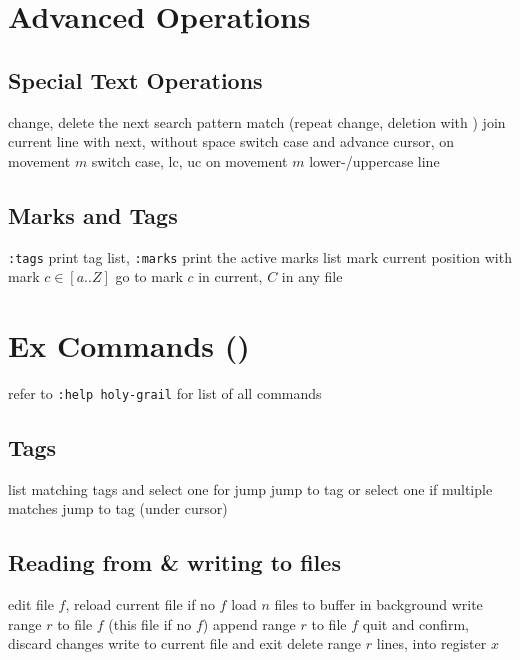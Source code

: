 \section{Advanced Operations}{}
\subsection{Special Text Operations}{}
	{change, delete the next search pattern match (repeat change, deletion with )}
	{join current line with next, without space}
	{switch case and advance cursor, on movement $m$ }
	{switch case, lc, uc on movement $m$}
	{lower-/uppercase line}

\subsection{Marks and Tags}	{{\tt :tags} print tag list, {\tt :marks} print the active marks list}
	{mark current position with mark $c\in[a..Z]$}
	{go to mark $c$ in current, $C$ in any file}

\section{Ex Commands (\enter)}	{refer to {\tt :help holy-grail} for list of all commands}
\subsection{Tags}	{}
	{list matching tags and select one for jump}
	{jump to tag or select one if multiple matches}
\cmdS{:ta\grey{g} \ctrl[ }	{jump to tag (under cursor)}

\subsection{Reading from \& writing to files}	{}
	{edit file $f$, reload current file if no $f$}
	{load $n$ files to buffer in background}
	{write range $r$ to file $f$ (this file if no $f$)}
	{append range $r$ to file $f$}
	{quit and confirm, discard changes}
	{write to current file and exit}
	{delete range $r$ lines, into register $x$}

